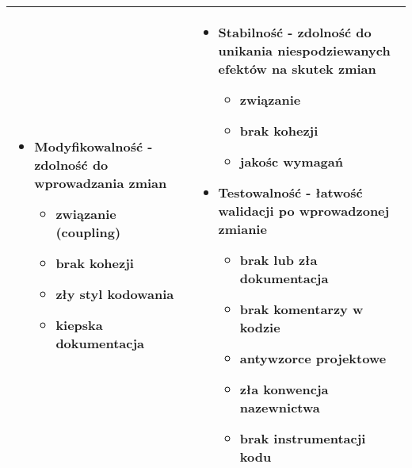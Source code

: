 \documentclass[../main.tex]{subfiles}
\begin{document}
\begin{table}[H]
\begin{center}
\begin{tabular}{| p{8cm} | p{8cm} |}
\begin{itemize}
                    \item \textbf{Modyfikowalność} - zdolność do wprowadzania zmian
                    \begin{itemize}
                        \item związanie (coupling)
                        \item brak kohezji
                        \item zły styl kodowania
                        \item kiepska dokumentacja
                    \end{itemize}
                \end{itemize}
                &
                \begin{itemize}
                    \item \textbf{Stabilność} - zdolność do unikania niespodziewanych efektów na skutek zmian
                    \begin{itemize}
                        \item związanie
                        \item brak kohezji
                        \item jakośc wymagań
                    \end{itemize}

                    \item \textbf{Testowalność} - łatwość walidacji po wprowadzonej zmianie
                    \begin{itemize}
                        \item brak lub zła dokumentacja
                        \item brak komentarzy w kodzie
                        \item antywzorce projektowe
                        \item zła konwencja nazewnictwa
                        \item brak instrumentacji kodu
                    \end{itemize}
                \end{itemize}\\
                \hline
            \end{tabular}
        \end{center}
    \end{table}
\end{document}
